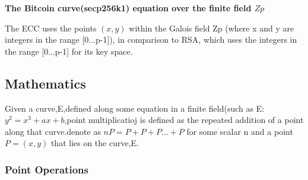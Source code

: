 \documentclass{article}
\begin{document}
\hspace{4.5cm}
\begin{centre}
\end{centre}

\textbf{The Bitcoin curve(secp256k1) equation over the finite field \(Zp\)}

\hspace{4.5cm}
\begin{centre}
\end{centre}

The ECC uses the points \( (x,y) \) within the Galois field Zp (where x and y are integers in the range [0...p-1]), in comparison to RSA, which uses the integers in the range [0...p-1] for its key space.
\subsection{Mathematics}
Given a curve,E,defined along some equation in a finite field(such as E:\(y^2=x^3+ax+b\),point multiplicatioj is defined as the repeated addition of a point along that curve.denote as \(nP=P+P+P...+P\) for some scalar n and a point \(P=(x,y)\) that lies on  the curve,E.
\subsubsection{Point Operations}
\end{document}
